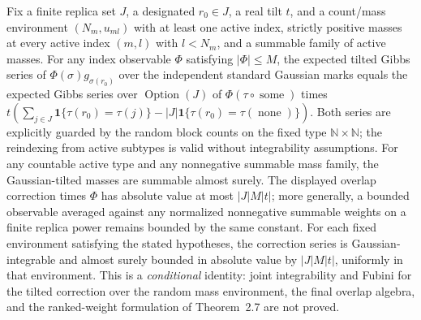 \begin{lemma}\label{lem:sg:pd-conditional-ibp}
  \leanok
  Fix a finite replica set $J$, a designated $r_0\in J$, a real tilt $t$, and a
  count/mass environment $(N_m,u_{ml})$ with at least one active index, strictly positive
  masses at every active index $(m,l)$ with $l<N_m$, and a summable family of active
  masses. For any index observable $\Phi$ satisfying $|\Phi|\le M$, the expected
  tilted Gibbs series of $\Phi(\sigma)g_{\sigma(r_0)}$ over the independent standard
  Gaussian marks equals the expected Gibbs series over $\operatorname{Option}(J)$ of
  $\Phi(\tau\circ\operatorname{some})$ times
  $t(\sum_{j\in J}\mathbf 1\{\tau(r_0)=\tau(j)\}
     -|J|\mathbf 1\{\tau(r_0)=\tau(\operatorname{none})\})$.
  Both series are explicitly guarded by the random block counts on the fixed type
  $\mathbb N\times\mathbb N$; the reindexing from active subtypes is valid without
  integrability assumptions. For any countable active type and any nonnegative summable
  mass family, the Gaussian-tilted masses are summable almost surely. The displayed
  overlap correction times $\Phi$ has absolute value at most $|J|M|t|$; more generally,
  a bounded observable averaged against any normalized nonnegative summable weights on
  a finite replica power remains bounded by the same constant. For each fixed environment
  satisfying the stated hypotheses, the correction series is Gaussian-integrable and
  almost surely bounded in absolute value by $|J|M|t|$, uniformly in that environment.
  This is a \emph{conditional} identity: joint integrability and Fubini for the tilted
  correction over the random mass environment, the final overlap algebra, and the
  ranked-weight formulation of Theorem~2.7 are not proved.
\end{lemma}

